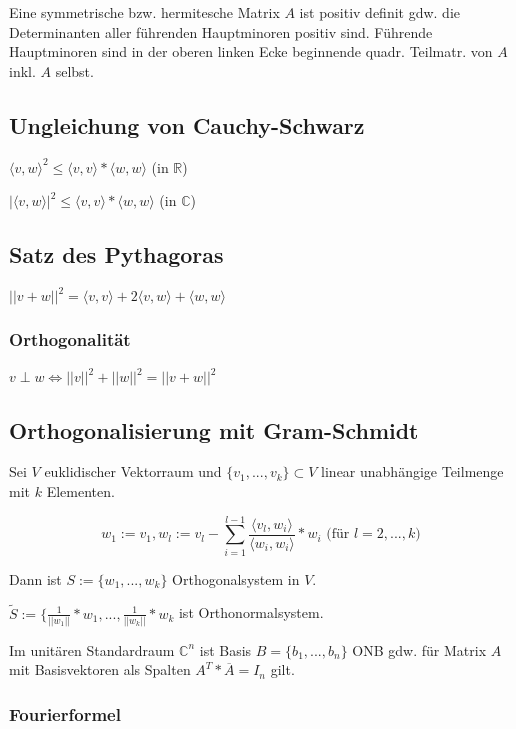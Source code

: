 Eine symmetrische bzw. hermitesche Matrix $A$ ist positiv definit gdw. die Determinanten aller führenden Hauptminoren positiv sind. Führende Hauptminoren sind in der oberen linken Ecke beginnende quadr. Teilmatr. von $A$ inkl. $A$ selbst.

\subsection*{Ungleichung von Cauchy-Schwarz}

$\langle v, w \rangle ^2 \leq \langle v, v \rangle * \langle w, w \rangle$ (in $\mathbb{R}$)

$|\langle v, w \rangle |^2 \leq \langle v, v \rangle * \langle w, w \rangle$ (in $\mathbb{C}$)

\subsection*{Satz des Pythagoras}

$||v+w||^2 = \langle v, v \rangle + 2\langle v, w \rangle + \langle w, w \rangle$

\subsubsection*{Orthogonalität}

$v \perp w \Leftrightarrow ||v||^2 + ||w||^2 = ||v+w||^2$

\subsection*{Orthogonalisierung mit Gram-Schmidt}

Sei $V$ euklidischer Vektorraum und $\{v_1, ..., v_k\} \subset V$ linear unabhängige Teilmenge mit $k$ Elementen.

\vspace*{-4mm}
$$w_1 := v_1, w_l := v_l - \sum_{i=1}^{l-1} \frac{\langle v_l, w_i \rangle}{\langle w_i, w_i\rangle}*w_i \text{ (für } l = 2, ..., k)$$

Dann ist $S := \{w_1, ..., w_k\}$ Orthogonalsystem in $V$.

$\tilde S := \{\frac{1}{||w_1||}*w_1, ..., \frac{1}{||w_k||}*w_k$ ist Orthonormalsystem.

Im unitären Standardraum $\mathbb{C}^n$ ist Basis $B = \{b_1, ..., b_n\}$ ONB gdw. für Matrix $A$ mit Basisvektoren als Spalten $A^T*\overline A = I_n$ gilt.

\subsubsection*{Fourierformel}

